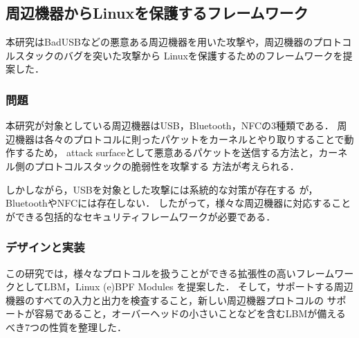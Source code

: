 \documentclass[platex,a4j,10pt,twoside,twocolumn,dvipdfmx]{jsarticle}
\begin{document}
  \subsection{周辺機器からLinuxを保護するフレームワーク\cite{tian2019lbm}}
    本研究はBadUSBなどの悪意ある周辺機器を用いた攻撃や，周辺機器のプロトコルスタックのバグを突いた攻撃から
    Linuxを保護するためのフレームワークを提案した．

    \subsubsection{問題}
      本研究が対象としている周辺機器はUSB，Bluetooth，NFCの3種類である．
      周辺機器は各々のプロトコルに則ったパケットをカーネルとやり取りすることで動作するため，
      attack surfaceとして悪意あるパケットを送信する方法と，カーネル側のプロトコルスタックの脆弱性を攻撃する
      方法が考えられる．

      しかしながら，USBを対象とした攻撃には系統的な対策が存在する \cite{tian2016making}が，
      BluetoothやNFCには存在しない．
      したがって，様々な周辺機器に対応することができる包括的なセキュリティフレームワークが必要である．
      
    \subsubsection{デザインと実装}
      この研究では，様々なプロトコルを扱うことができる拡張性の高いフレームワークとしてLBM，Linux (e)BPF Modules
      を提案した．
      そして，サポートする周辺機器のすべての入力と出力を検査すること，新しい周辺機器プロトコルの
      サポートが容易であること，オーバーヘッドの小さいことなどを含むLBMが備えるべき7つの性質を整理した．
      
\end{document}
